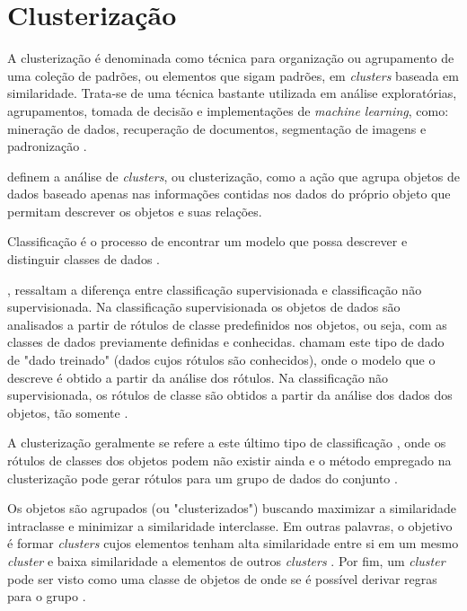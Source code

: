 \chapter{Clusterização} \label{cap:clusterizacao}

A clusterização é denominada como técnica para organização ou agrupamento de uma coleção de padrões, ou elementos que sigam padrões, em \textit{clusters} baseada em similaridade.
Trata-se de uma técnica bastante utilizada em análise exploratórias, agrupamentos, tomada de decisão e implementações de \textit{machine learning}, como:
mineração de dados, recuperação de documentos, segmentação de imagens e padronização \cite{clustering_review}.

 definem a análise de \textit{clusters}, ou clusterização, como a ação que agrupa objetos de dados baseado apenas nas informações contidas
nos dados do próprio objeto que permitam descrever os objetos e suas relações. 

Classificação é o processo de encontrar um modelo que possa descrever e distinguir classes de dados \cite{han2011data}.

,  ressaltam a diferença entre classificação supervisionada e classificação não supervisionada.
Na classificação supervisionada os objetos de dados são analisados a partir de rótulos de classe predefinidos nos objetos, ou seja, 
com as classes de dados previamente definidas e conhecidas.  chamam este tipo de dado de "dado treinado"
(dados cujos rótulos são conhecidos), onde o modelo que o descreve é obtido a partir da análise dos rótulos.
Na classificação não supervisionada, os rótulos de classe são obtidos a partir da análise dos dados dos objetos, tão somente \cite{tan2013data}.

A clusterização geralmente se refere a este último tipo de classificação \cite{tan2013data}, onde os rótulos de classes dos objetos podem não existir ainda e 
o método empregado na clusterização pode gerar rótulos para um grupo de dados do conjunto \cite{han2011data}.

Os objetos são agrupados (ou "clusterizados") buscando maximizar a similaridade intraclasse e minimizar a similaridade interclasse.
Em outras palavras, o objetivo é formar \textit{clusters} cujos elementos tenham alta similaridade entre si em um mesmo \textit{cluster} 
e baixa similaridade a elementos de outros \textit{clusters} \cite{han2011data}. Por fim, um \textit{cluster} pode ser visto como uma
classe de objetos de onde se é possível derivar regras para o grupo \cite{han2011data}.

